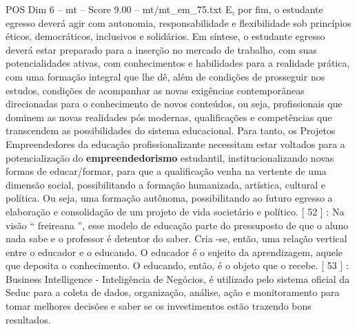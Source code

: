 \begin{textsample}{POS Dim 6 – mt – Score 9.00 – mt/mt\_em\_75.txt}
E, por fim, o estudante egresso deverá agir com autonomia, responsabilidade e flexibilidade sob princípios éticos, democráticos, inclusivos e solidários.
Em síntese, o estudante egresso deverá estar preparado para a inserção no mercado de trabalho, com suas potencialidades ativas, com conhecimentos e habilidades para a realidade prática, com uma formação integral que lhe dê, além de condições de prosseguir nos estudos, condições de acompanhar as novas exigências contemporâneas direcionadas para o conhecimento de novos conteúdos, ou seja, profissionais que dominem as novas realidades pós modernas, qualificações e competências que transcendem as possibilidades do sistema educacional.
Para tanto, os Projetos Empreendedores da educação profissionalizante necessitam estar voltados para a potencialização do \textbf{empreendedorismo} estudantil, institucionalizando novas formas de educar/formar, para que a qualificação venha na vertente de uma dimensão social, possibilitando a formação humanizada, artística, cultural e política.
Ou seja, uma formação autônoma, possibilitando ao futuro egresso a elaboração e consolidação de um projeto de vida societário e político. [ 52 ] : Na visão “ freireana ”, esse modelo de educação parte do pressuposto de que o aluno nada sabe e o professor é detentor do saber.
Cria -se, então, uma relação vertical entre o educador e o educando.
O educador é o sujeito da aprendizagem, aquele que deposita o conhecimento.
O educando, então, é o objeto que o recebe. [ 53 ] : Business Intelligence - Inteligência de Negócios, é utilizado pelo sistema oficial da Seduc para a coleta de dados, organização, análise, ação e monitoramento para tomar melhores decisões e saber se os investimentos estão trazendo bons resultados.

\end{textsample}
